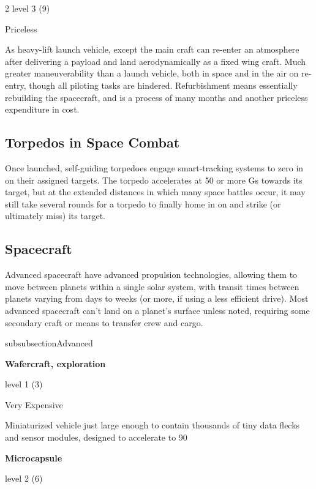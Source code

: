 \begin{multicols}{2}
level 3 (9) 

Priceless 

As heavy-lift launch vehicle, except the main craft can re-enter an atmosphere after delivering a payload and land aerodynamically as a fixed wing craft. Much greater maneuverability than a launch vehicle, both in space and in the air on re-entry, though all piloting tasks are hindered. Refurbishment means essentially rebuilding the spacecraft, and is a process of many months and another priceless expenditure in cost.

\subsection{Torpedos in Space Combat}

Once launched, self-guiding torpedoes engage smart-tracking systems to zero in on their assigned targets. The torpedo accelerates at 50 or more Gs towards its target, but at the extended distances in which many space battles occur, it may still take several rounds for a torpedo to finally home in on and strike (or ultimately miss) its target.

\subsection{Spacecraft}

Advanced spacecraft have advanced propulsion technologies, allowing them to move between planets within a single solar system, with transit times between planets varying from days to weeks (or more, if using a less efficient drive). Most advanced spacecraft can’t land on a planet’s surface unless noted, requiring some secondary craft or means to transfer crew and cargo.

subsubsection{Advanced}

\textbf{Wafercraft, exploration} 

level 1 (3) 

Very Expensive 

Miniaturized vehicle just large enough to contain thousands of tiny data flecks and sensor modules, designed to accelerate to 90%

\textbf{Microcapsule} 

level 2 (6) 


\end{multicols}

